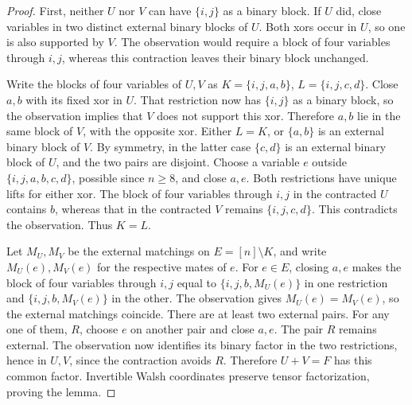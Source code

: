 \documentclass[11pt,letterpaper,onecolumn]{article}
\theoremstyle{plain}
\theoremstyle{definition}
\theoremstyle{remark}
\begin{document}
\begin{proof}
		First, neither \(U\) nor \(V\) can have \(\{i,j\}\) as a binary block.
		If \(U\) did, close variables in two distinct external binary blocks of
		\(U\).  Both xors occur in \(U\), so one is also supported by \(V\).
		The observation would require a block of four variables through \(i,j\), whereas
		this contraction leaves their binary block unchanged.
		
		Write the blocks of four variables of \(U,V\) as
		\(K=\{i,j,a,b\}\), \(L=\{i,j,c,d\}\).  Close \(a,b\) with its fixed
		xor in \(U\).  That restriction now has \(\{i,j\}\) as a binary block, so the
		observation implies that \(V\) does not support this xor.  Therefore
		\(a,b\) lie in the same block of \(V\), with the opposite xor.  Either
		\(L=K\), or \(\{a,b\}\) is an external binary block of \(V\).  By
		symmetry, in the latter case \(\{c,d\}\) is an external binary block of
		\(U\), and the two pairs are disjoint.  Choose a variable \(e\) outside
		\(\{i,j,a,b,c,d\}\), possible since \(n\ge8\), and close \(a,e\).
		Both restrictions have unique lifts for either xor.  The block of four variables through
		\(i,j\) in the contracted \(U\) contains \(b\), whereas that in the
		contracted \(V\) remains \(\{i,j,c,d\}\).  This contradicts the
		observation.  Thus \(K=L\).
		
		Let \(M_U,M_V\) be the external matchings on \(E=[n]\setminus K\),
		and write \(M_U(e),M_V(e)\) for the respective mates of \(e\).
		For \(e\in E\), closing \(a,e\) makes the block of four variables through
		\(i,j\) equal to \(\{i,j,b,M_U(e)\}\) in one restriction and
		\(\{i,j,b,M_V(e)\}\) in the other.  The observation gives
		\(M_U(e)=M_V(e)\), so the external matchings coincide.  There are at least
		two external pairs.  For any one of them, \(R\), choose \(e\) on another
		pair and close \(a,e\).  The pair \(R\) remains external.  The observation
		now identifies its binary factor in the two restrictions, hence in
		\(U,V\), since the contraction avoids \(R\).  Therefore \(U+V=F\) has
		this common factor.  Invertible Walsh coordinates preserve tensor
		factorization, proving the lemma.
	\end{proof}
	
\end{document}
